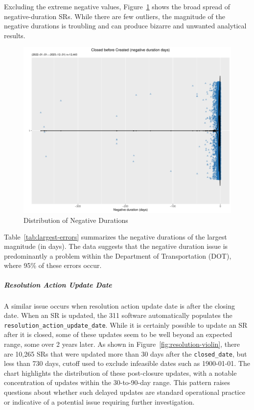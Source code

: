 \documentclass[linenumber]{jdsart}
\begin{document}
Excluding the extreme negative values, 
Figure~\ref{fig:negative-duration-violin} shows the broad spread of 
negative-duration SRs. While there are few outliers, the magnitude 
of the negative durations is troubling and can produce bizarre
and unwanted analytical results.

\begin{figure}[tbp]
	 \centering
 	 \includegraphics[width=\textwidth]{negative_duration_SR_violin.pdf}
 \caption{Distribution of Negative Durations}
 \label{fig:negative-duration-violin}
\end{figure}

Table~\ref{tab:largest-errors} summarizes the 
negative durations of the largest magnitude (in days). The data 
suggests that the negative duration issue is predominantly a problem 
within the Department of Transportation (DOT), where 95\% of these 
errors occur.

\subparagraph{Resolution Action Update Date}
	
A similar issue occurs when resolution action update date is after the
closing date.  When an SR is updated, the 311 software 
automatically populates the \texttt{resolution\_action\_update\_date}. 
While it is certainly possible to update an SR after it is closed, 
some of these updates seem to be well beyond an expected 
range, some over 2 years later. As shown in 
Figure~\ref{fig:resolution-violin}, there are 10,265 SRs that 
were updated more than 30 days after the 
\texttt{closed\_date}, but less than 730 days, cutoff used to 
exclude infeasible dates such as 1900-01-01. The chart 
highlights the distribution of these post-closure updates, with 
a notable concentration of updates within 
the 30-to-90-day range. This pattern raises questions about whether 
such delayed updates are standard operational practice or indicative 
of a potential issue requiring further investigation. 
\end{document}
